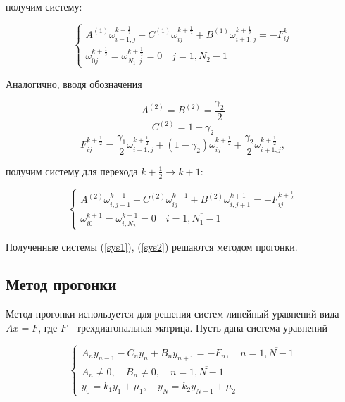 \documentclass[12pt]{article}
\begin{document}
			получим систему:
				
				\begin{equation}
					\begin{cases}
						A^{(1)} \omega^{k + \frac{1}{2}}_{i-1,j} - C^{(1)} \omega^{k+\frac{1}{2}}_{ij} + B^{(1)} \omega^{k+\frac{1}{2}}_{i+1,j} = -F^k_{ij} \\
						\omega^{k+\frac{1}{2}}_{0j} = \omega^{k+\frac{1}{2}}_{N_1,j} = 0 \quad j = \overline{1, N_2-1}
					\end{cases}
					\label{sys1}
				\end{equation}
				
			Аналогично, вводя обозначения
			
			$$A^{(2)} = B^{(2)} = \frac{\gamma_2}{2}$$
			$$C^{(2)} = 1 + \gamma_2$$
			$$F^{k+\frac{1}{2}}_{ij} = \frac{\gamma_1}{2} \omega^{k+\frac{1}{2}}_{i-1,j} + (1 - \gamma_2) \omega^{k+\frac{1}{2}}_{ij} + \frac{\gamma_2}{2} \omega^{k+\frac{1}{2}}_{i+1,j},$$
			
			получим систему для перехода $k + \frac{1}{2} \rightarrow k + 1:$
			
				\begin{equation}
					\begin{cases}
						A^{(2)} \omega^{k+1}_{i,j-1} - C^{(2)} \omega^{k+1}_{ij} + B^{(2)} \omega^{k+1}_{i,j+1} = -F^{k + \frac{1}{2}}_{ij} \\
						\omega^{k+1}_{i0} = \omega^{k+1}_{i,N_2} = 0 \quad i = \overline{1, N_1-1}
					\end{cases}
					\label{sys2}
				\end{equation}
			
			Полученные системы (\ref{sys1}), (\ref{sys2}) решаются методом прогонки.
			
		\subsection{Метод прогонки}
			Метод прогонки используется для решения систем линейный уравнений вида $Ax = F$, где $F$ - трехдиагональная матрица.
			Пусть дана система уравнений
			
			\begin{equation}
				\begin{cases}
					A_n y_{n-1} - C_n y_n + B_n y_{n+1} = -F_n, \quad n = \overline{1, N-1} \\
					A_n \neq 0, \quad B_n \neq 0, \quad n = \overline{1, N-1} \\
					y_0 = k_1 y_1 + \mu_1, \quad y_N = k_2 y_{N-1} + \mu_2
				\end{cases}
			\end{equation}
			
\end{document}
